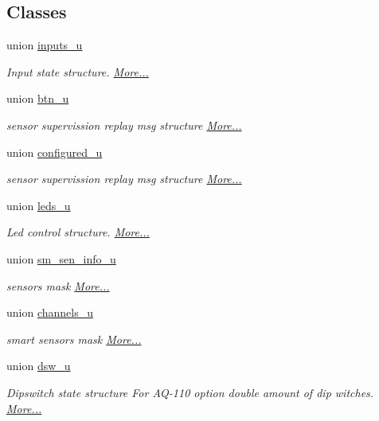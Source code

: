 \subsection*{Classes}
\begin{DoxyCompactItemize}
\item 
union \hyperlink{a00001_d4/d63/a00082}{inputs\+\_\+u}
\begin{DoxyCompactList}\small\item\em Input state structure.  \hyperlink{a00001_d4/d63/a00082}{More...}\end{DoxyCompactList}\item 
union \hyperlink{a00001_d7/df7/a00058}{btn\+\_\+u}
\begin{DoxyCompactList}\small\item\em sensor supervission replay msg structure  \hyperlink{a00001_d7/df7/a00058}{More...}\end{DoxyCompactList}\item 
union \hyperlink{a00001_df/d03/a00062}{configured\+\_\+u}
\begin{DoxyCompactList}\small\item\em sensor supervission replay msg structure  \hyperlink{a00001_df/d03/a00062}{More...}\end{DoxyCompactList}\item 
union \hyperlink{a00001_df/d5d/a00084}{leds\+\_\+u}
\begin{DoxyCompactList}\small\item\em Led control structure.  \hyperlink{a00001_df/d5d/a00084}{More...}\end{DoxyCompactList}\item 
union \hyperlink{a00001_d1/d88/a00128}{sm\+\_\+sen\+\_\+info\+\_\+u}
\begin{DoxyCompactList}\small\item\em sensors mask  \hyperlink{a00001_d1/d88/a00128}{More...}\end{DoxyCompactList}\item 
union \hyperlink{a00001_d9/d73/a00060}{channels\+\_\+u}
\begin{DoxyCompactList}\small\item\em smart sensors mask  \hyperlink{a00001_d9/d73/a00060}{More...}\end{DoxyCompactList}\item 
union \hyperlink{a00001_de/de1/a00065}{dsw\+\_\+u}
\begin{DoxyCompactList}\small\item\em Dipswitch state structure For A\+Q-\/110 option double amount of dip witches.  \hyperlink{a00001_de/de1/a00065}{More...}\end{DoxyCompactList}\item 

\end{DoxyCompactItemize}
